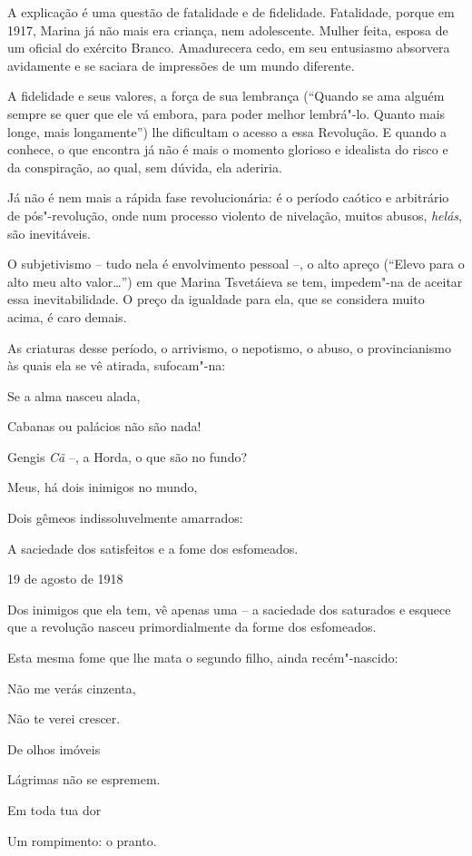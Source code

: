 A explicação é uma questão de fatalidade e de fidelidade. Fatalidade,
porque em 1917, Marina já não mais era criança, nem adolescente. Mulher
feita, esposa de um oficial do exército Branco. Amadurecera cedo, em seu
entusiasmo absorvera avidamente e se saciara de impressões de um mundo
diferente.

A fidelidade e seus valores, a força de sua lembrança (``Quando se ama
alguém sempre se quer que ele vá embora, para poder melhor lembrá"-lo.
Quanto mais longe, mais longamente'') lhe dificultam o acesso a essa
Revolução. E quando a conhece, o que encontra já não é mais o momento
glorioso e idealista do risco e da conspiração, ao qual, sem dúvida, ela
aderiria.

Já não é nem mais a rápida fase revolucionária: é o período caótico e
arbitrário de pós"-revolução, onde num processo violento de nivelação,
muitos abusos, \emph{helás}, são inevitáveis.

O subjetivismo -- tudo nela é envolvimento pessoal --, o alto apreço
(``Elevo para o alto meu alto valor\ldots{}'') em que Marina Tsvetáieva se
tem, impedem"-na de aceitar essa inevitabilidade. O preço da igualdade
para ela, que se considera muito acima, é caro demais.

As criaturas desse período, o arrivismo, o nepotismo, o abuso, o
provincianismo às quais ela se vê atirada, sufocam"-na:

Se a alma nasceu alada,

Cabanas ou palácios não são nada!

Gengis \emph{Cã} --, a Horda, o que são no fundo?

Meus, há dois inimigos no mundo,

Dois gêmeos indissoluvelmente amarrados:

A saciedade dos satisfeitos e a fome dos esfomeados.

19 de agosto de 1918

Dos inimigos que ela tem, vê apenas uma -- a saciedade dos saturados e
esquece que a revolução nasceu primordialmente da forme dos esfomeados.

Esta mesma fome que lhe mata o segundo filho, ainda recém"-nascido:

Não me verás cinzenta,

Não te verei crescer.

De olhos imóveis

Lágrimas não se espremem.

Em toda tua dor

Um rompimento: o pranto.

